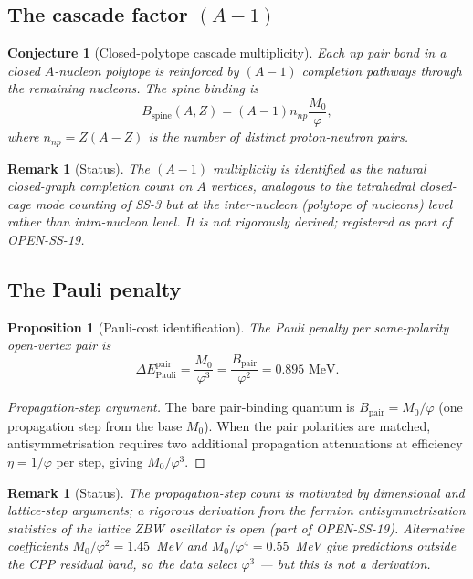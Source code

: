 \documentclass[11pt,letterpaper]{article}
\newtheorem{proposition}[theorem]{Proposition}
\newtheorem{conjecture}[theorem]{Conjecture}
\newtheorem{remark}[theorem]{Remark}
\newcommand{\phig}{\varphi}
\newcommand{\Mzero}{M_0}
\newcommand{\Bpair}{B_{\mathrm{pair}}}
\newcommand{\npnp}{n_{np}}
\begin{document}
\subsection{The cascade factor $(A-1)$}

\begin{conjecture}[Closed-polytope cascade multiplicity]
\label{conj:cascade}
Each np pair bond in a closed $A$-nucleon polytope is reinforced by $(A-1)$ completion pathways through the remaining nucleons. The spine binding is
\begin{equation}
B_{\mathrm{spine}}(A, Z) = (A-1) \npnp \frac{\Mzero}{\phig},
\label{eq:spine}
\end{equation}
where $\npnp = Z(A-Z)$ is the number of distinct proton-neutron pairs.
\end{conjecture}

\begin{remark}[Status]
The $(A-1)$ multiplicity is identified as the natural closed-graph completion count on $A$ vertices, analogous to the tetrahedral closed-cage mode counting of SS-3 but at the inter-nucleon (polytope of nucleons) level rather than intra-nucleon level. It is \emph{not rigorously derived}; registered as part of OPEN-SS-19.
\end{remark}

\subsection{The Pauli penalty}

\begin{proposition}[Pauli-cost identification]
\label{prop:pauli}
The Pauli penalty per same-polarity open-vertex pair is
\begin{equation}
\Delta E_{\mathrm{Pauli}}^{\mathrm{pair}} = \frac{\Mzero}{\phig^3} = \frac{\Bpair}{\phig^2} = 0.895 \text{ MeV}.
\label{eq:pauli}
\end{equation}
\end{proposition}

\begin{proof}[Propagation-step argument]
The bare pair-binding quantum is $\Bpair = \Mzero/\phig$ (one propagation step from the base $\Mzero$). When the pair polarities are matched, antisymmetrisation requires two additional propagation attenuations at efficiency $\eta = 1/\phig$ per step, giving $\Mzero/\phig^3$.
\end{proof}

\begin{remark}[Status]
The propagation-step count is motivated by dimensional and lattice-step arguments; a rigorous derivation from the fermion antisymmetrisation statistics of the lattice ZBW oscillator is open (part of OPEN-SS-19). Alternative coefficients $\Mzero/\phig^2 = 1.45$~MeV and $\Mzero/\phig^4 = 0.55$~MeV give predictions outside the CPP residual band, so the data select $\phig^3$ --- but this is not a derivation.
\end{remark}
\end{document}
